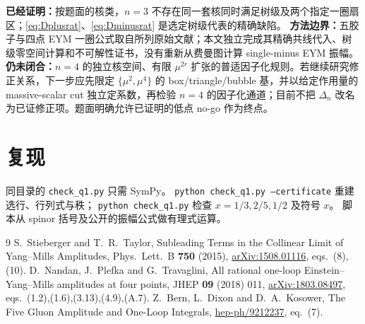 \documentclass[UTF8,a4paper,11pt]{ctexart}
\begin{document}
\textbf{已经证明：}按题面的核类，\(n=3\) 不存在同一套核同时满足树级及两个指定一圈扇区；\eqref{eq:Dplusrat}、\eqref{eq:Dminusrat} 是选定树级代表的精确缺陷。
\textbf{方法边界：}五胶子与四点 EYM 一圈公式取自所列原始文献；本文独立完成其精确共线代入、树级零空间计算和不可解性证书，没有重新从费曼图计算 single-minus EYM 振幅。
\textbf{仍未闭合：}\(n=4\) 的独立核空间、有限 \(\mu^{2r}\) 扩张的普适因子化规则。若继续研究修正关系，下一步应先限定
\(\{\mu^2,\mu^4\}\) 的 box/triangle/bubble 基，并以给定作用量的 massive-scalar cut 独立定系数，再检验 \(n=4\) 的因子化通道；目前不把 \(\Delta_n\) 改名为已证修正项。题面明确允许已证明的低点 no-go 作为终点。

\section*{复现}
同目录的 \texttt{check\_q1.py} 只需 SymPy。
\texttt{python check\_q1.py --certificate} 重建选行、行列式与秩；
\texttt{python check\_q1.py} 检查 \(x=1/3,2/5,1/2\) 及符号 \(x\)。
脚本从 spinor 括号及公开的振幅公式做有理式运算。

\begin{thebibliography}{9}
 S.~Stieberger and T.~R.~Taylor, Subleading Terms in the Collinear Limit of Yang--Mills Amplitudes, Phys.\ Lett.\ B \textbf{750} (2015), \href{https://arxiv.org/abs/1508.01116}{arXiv:1508.01116}, eqs.\ (8),(10).
 D.~Nandan, J.~Plefka and G.~Travaglini, All rational one-loop Einstein--Yang--Mills amplitudes at four points, JHEP \textbf{09} (2018) 011, \href{https://arxiv.org/abs/1803.08497}{arXiv:1803.08497}, eqs.\ (1.2),(1.6),(3.13),(4.9),(A.7).
 Z.~Bern, L.~Dixon and D.~A.~Kosower, The Five Gluon Amplitude and One-Loop Integrals, \href{https://arxiv.org/abs/hep-ph/9212237}{hep-ph/9212237}, eq.\ (7).
\end{thebibliography}
\end{document}
